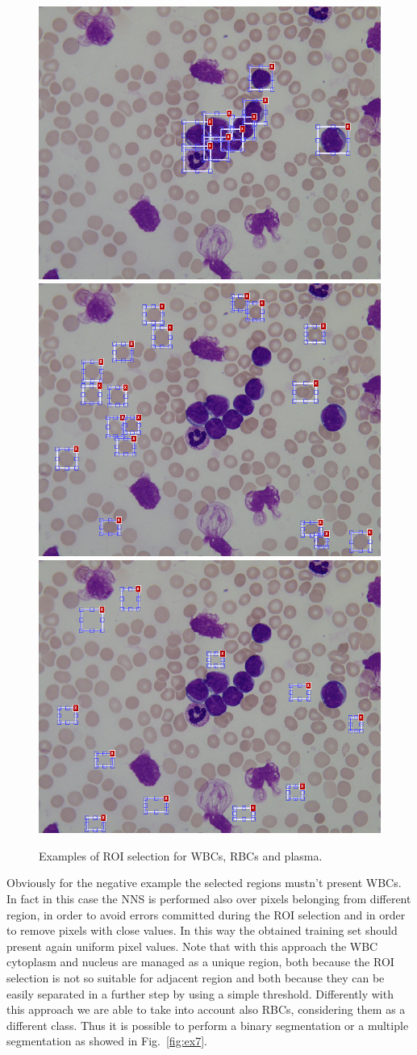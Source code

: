 \documentclass[final,a4paper,12pt,english]{UnicaPhdThesis3}
\begin{document}
	\begin{figure}[!b]
		\centering
		\includegraphics[height=0.25\textwidth]{images/2015_1_caip/ROI1}
		\includegraphics[height=0.25\textwidth]{images/2015_1_caip/ROI2}
		\includegraphics[height=0.25\textwidth]{images/2015_1_caip/ROI3}
		\caption{\label{fig:ex6}Examples of ROI selection for WBCs, RBCs and plasma.}
	\end{figure}
	
	Obviously for the negative example the selected regions mustn't present WBCs. In fact in this case the NNS is performed also over pixels belonging from different region, in order to avoid errors committed during the ROI selection and in order to remove pixels with close values. In this way the obtained training set should present again uniform pixel values. Note that with this approach the WBC cytoplasm and nucleus are managed as a unique region, both because the ROI selection is not so suitable for adjacent region and both because they can be easily separated in a further step by using a simple threshold. Differently with this approach we are able to take into account also RBCs, considering them as a different class.
	Thus it is possible to perform a binary segmentation or a multiple segmentation as showed in Fig.~\ref{fig:ex7}.
	
\end{document}
